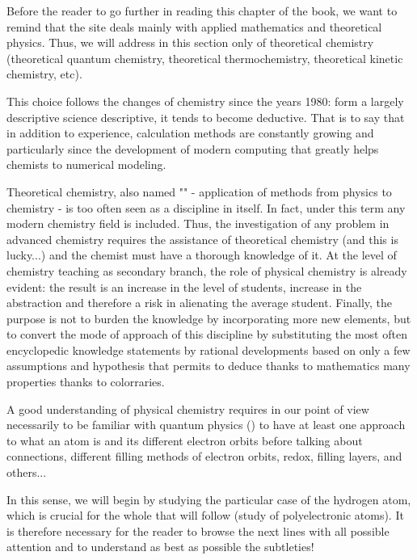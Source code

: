 	Before the reader to go further in reading this chapter of the book, we want to remind that the site deals mainly with applied mathematics and theoretical physics. Thus, we will address in this section only of theoretical chemistry (theoretical quantum  chemistry, theoretical thermochemistry, theoretical kinetic chemistry, etc).
	
	This choice follows the changes of chemistry since the years 1980: form a largely descriptive science descriptive, it tends to become deductive. That is to say that in addition to experience, calculation methods are constantly growing and particularly since the development of modern computing that greatly helps chemists to numerical modeling.	
	
	Theoretical chemistry, also named "" - application of methods from physics to chemistry - is too often seen as a discipline in itself. In fact, under this term any modern chemistry field is included. Thus, the investigation of any problem in advanced chemistry requires the assistance of theoretical chemistry (and this is lucky...) and the chemist must have a thorough knowledge of it. At the level of chemistry teaching as secondary branch, the role of physical chemistry is already evident: the result is an increase in the level of students, increase in the abstraction and therefore a risk in alienating the average student. Finally, the purpose is not to burden the knowledge by incorporating more new elements, but to convert the mode of approach of this discipline by substituting the most often encyclopedic knowledge statements by rational developments based on only a few assumptions and hypothesis that permits to deduce thanks to mathematics many properties thanks to colorraries.
	
	A good understanding of physical chemistry requires in our point of view necessarily to be familiar with quantum physics () to have at least one approach to what an atom is and its different electron orbits before talking about connections, different filling methods of electron orbits, redox, filling layers, and others...
	
	In this sense, we will begin by studying the particular case of the hydrogen atom, which is crucial for the whole that will follow (study of polyelectronic atoms). It is therefore necessary for the reader to browse the next lines with all possible attention and to understand as best as possible the subtleties!
	
